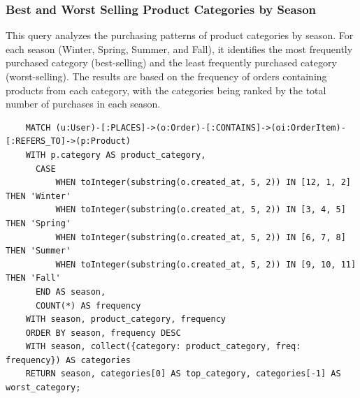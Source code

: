 \documentclass[a4paper,12pt]{article}
\begin{document}
\subsubsection{Best and Worst Selling Product Categories by Season}
This query analyzes the purchasing patterns of product categories by season. For each season (Winter, Spring, Summer, and Fall),
it identifies the most frequently purchased category (best-selling) and the least frequently purchased category (worst-selling).
The results are based on the frequency of orders containing products from each category, with the categories being ranked by the total number of purchases in each season.
\begin{verbatim}
    MATCH (u:User)-[:PLACES]->(o:Order)-[:CONTAINS]->(oi:OrderItem)-[:REFERS_TO]->(p:Product)
    WITH p.category AS product_category, 
      CASE 
          WHEN toInteger(substring(o.created_at, 5, 2)) IN [12, 1, 2] THEN 'Winter'
          WHEN toInteger(substring(o.created_at, 5, 2)) IN [3, 4, 5] THEN 'Spring'
          WHEN toInteger(substring(o.created_at, 5, 2)) IN [6, 7, 8] THEN 'Summer'
          WHEN toInteger(substring(o.created_at, 5, 2)) IN [9, 10, 11] THEN 'Fall'
      END AS season, 
      COUNT(*) AS frequency
    WITH season, product_category, frequency
    ORDER BY season, frequency DESC
    WITH season, collect({category: product_category, freq: frequency}) AS categories
    RETURN season, categories[0] AS top_category, categories[-1] AS worst_category;
\end{verbatim}  
\end{document}
